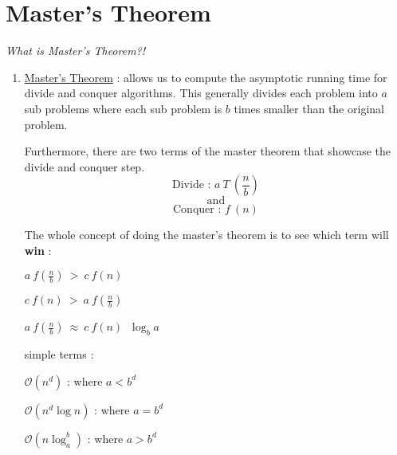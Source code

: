 \documentclass[10pt,letterpaper]{article}
\begin{document}
{\begin{enumerate}
    
	
\end{enumerate}
} %

{
\newpage{}

\section*{Master's Theorem}
\emph{What is Master's Theorem?!}
\begin{enumerate}
	\item[]
	\begin{center}
	\underline{Master's Theorem} : allows us to compute the asymptotic running time for divide and conquer algorithms. This generally divides each problem into ${a}$ sub problems where each sub problem is ${b}$ times smaller than the original problem.
	\end{center}
	
	Furthermore, there are two terms of the master theorem that showcase the divide and conquer step.
	$$\text{Divide	: } a \ T \ (\frac{n}{b})$$
	$$\text{and}$$
	$$\text{Conquer	: } f \ (n) $$
	
	{The whole concept of doing the master's theorem is to see which term will \textbf{win} :}
	
	\vspace{1em}

	\qquad $ a \ f (\frac{n}{b}) \ > \ c \ f(n) \ $ 

	\qquad $ c \ f(n) \ > \ a \ f (\frac{n}{b}) \ $	
	
	\qquad $ a \ f (\frac{n}{b}) \ \approx \ c \ f(n) \ $  $\log_{b}a$
	
	\vspace{2em}
	
    simple terms :
    
        \quad $\mathcal{O}(n^{d})$ : \qquad where \quad $a < b^{d}$
        
	    \quad $\mathcal{O}(n^{d}\log n)$ : \qquad where \quad $a = b^{d}$
	    
	    \quad $\mathcal{O}(n \log^{b}_{a}) $ : \qquad where \quad $a > b^{d}$
\end{enumerate}
} %
\end{document}
